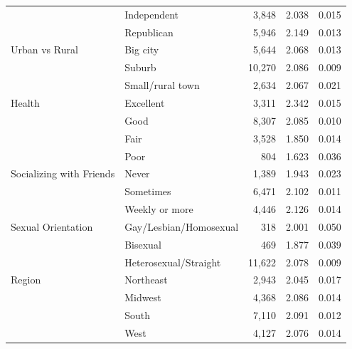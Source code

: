 \begin{table}[htbp]
\begin{tabular}{llrrr}
 & Independent & 3,848 & 2.038 & 0.015 \\
 & Republican & 5,946 & 2.149 & 0.013 \\
\midrule
Urban vs Rural & Big city & 5,644 & 2.068 & 0.013 \\
 & Suburb & 10,270 & 2.086 & 0.009 \\
 & Small/rural town & 2,634 & 2.067 & 0.021 \\
\midrule
Health & Excellent & 3,311 & 2.342 & 0.015 \\
 & Good & 8,307 & 2.085 & 0.010 \\
 & Fair & 3,528 & 1.850 & 0.014 \\
 & Poor & 804 & 1.623 & 0.036 \\
\midrule
Socializing with Friends & Never & 1,389 & 1.943 & 0.023 \\
 & Sometimes & 6,471 & 2.102 & 0.011 \\
 & Weekly or more & 4,446 & 2.126 & 0.014 \\
\midrule
Sexual Orientation & Gay/Lesbian/Homosexual & 318 & 2.001 & 0.050 \\
 & Bisexual & 469 & 1.877 & 0.039 \\
 & Heterosexual/Straight & 11,622 & 2.078 & 0.009 \\
\midrule
Region & Northeast & 2,943 & 2.045 & 0.017 \\
 & Midwest & 4,368 & 2.086 & 0.014 \\
 & South & 7,110 & 2.091 & 0.012 \\
 & West & 4,127 & 2.076 & 0.014 \\
\bottomrule
\end{tabular}
\end{table}
